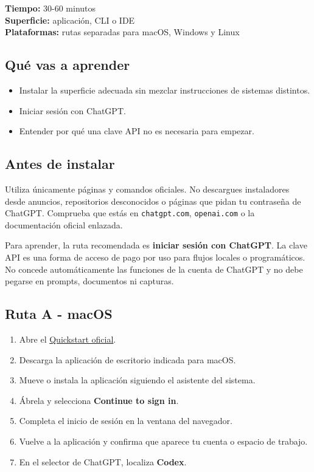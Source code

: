 \documentclass[10pt,a4paper,openany]{book}
\providecommand{\tightlist}{\setlength{\itemsep}{0.18em}\setlength{\parskip}{0pt}}
\begin{document}
\begin{metabox}

\textbf{Tiempo:} 30-60 minutos\\
\textbf{Superficie:} aplicación, CLI o IDE\\
\textbf{Plataformas:} rutas separadas para macOS, Windows y Linux

\end{metabox}

\subsection{Qué vas a aprender}\label{quuxe9-vas-a-aprender-2}

\begin{itemize}
\tightlist
\item
  Instalar la superficie adecuada sin mezclar instrucciones de sistemas
  distintos.
\item
  Iniciar sesión con ChatGPT.
\item
  Entender por qué una clave API no es necesaria para empezar.
\end{itemize}

\subsection{Antes de instalar}\label{antes-de-instalar}

Utiliza únicamente páginas y comandos oficiales. No descargues
instaladores desde anuncios, repositorios desconocidos o páginas que
pidan tu contraseña de ChatGPT. Comprueba que estás en
\texttt{chatgpt.com}, \texttt{openai.com} o la documentación oficial
enlazada.

Para aprender, la ruta recomendada es \textbf{iniciar sesión con
ChatGPT}. La clave API es una forma de acceso de pago por uso para
flujos locales o programáticos. No concede automáticamente las funciones
de la cuenta de ChatGPT y no debe pegarse en prompts, documentos ni
capturas.

\subsection{Ruta A - macOS}\label{ruta-a---macos}

\begin{enumerate}
\def\labelenumi{\arabic{enumi}.}
\tightlist
\item
  Abre el
  \href{https://learn.chatgpt.com/docs/quickstart?setup=app}{Quickstart
  oficial}.
\item
  Descarga la aplicación de escritorio indicada para macOS.
\item
  Mueve o instala la aplicación siguiendo el asistente del sistema.
\item
  Ábrela y selecciona \textbf{Continue to sign in}.
\item
  Completa el inicio de sesión en la ventana del navegador.
\item
  Vuelve a la aplicación y confirma que aparece tu cuenta o espacio de
  trabajo.
\item
  En el selector de ChatGPT, localiza \textbf{Codex}.
\end{enumerate}
\end{document}
